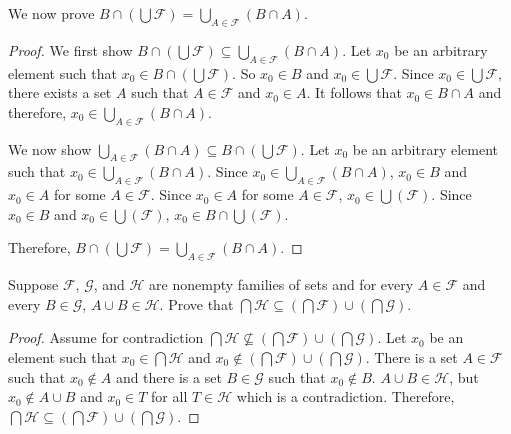 We now prove $B \cap (\bigcup \mathcal{F}) = \bigcup_{A \in \mathcal{F}}(B \cap
    A)$.

\begin{proof}
    We first show $B \cap (\bigcup \mathcal{F}) \subseteq \bigcup_{A \in \mathcal{F}}(B \cap A)$.
    Let $x_0$ be an arbitrary element such that $x_0 \in B \cap (\bigcup \mathcal{F})$.
    So $x_0 \in B$ and $x_0 \in \bigcup \mathcal{F}$.
    Since $x_0 \in \bigcup \mathcal{F}$, there exists a set $A$
    such that $A \in \mathcal{F}$ and $x_0 \in A$.
    It follows that $x_0 \in B \cap A$ and therefore, $x_0 \in \bigcup_{A \in \mathcal{F}}(B \cap A)$.

    We now show $\bigcup_{A \in \mathcal{F}}(B \cap A) \subseteq B \cap (\bigcup
        \mathcal{F})$. Let $x_0$ be an arbitrary element such that $x_0 \in \bigcup_{A
            \in \mathcal{F}}(B \cap A)$. Since $x_0 \in \bigcup_{A \in \mathcal{F}}(B \cap
        A)$, $x_0 \in B$ and $x_0 \in A$ for some $A \in \mathcal{F}$. Since $x_0 \in
        A$ for some $A \in \mathcal{F}$, $x_0 \in \bigcup(\mathcal{F})$. Since $x_0 \in
        B$ and $x_0 \in \bigcup(\mathcal{F})$, $x_0 \in B \cap \bigcup(\mathcal{F})$.

    Therefore, $B \cap (\bigcup \mathcal{F}) = \bigcup_{A \in \mathcal{F}}(B \cap
        A)$.
\end{proof}

\begin{tcolorbox}[title=Problem 18, breakable]
    Suppose $\mathcal{F}$, $\mathcal{G}$, and $\mathcal{H}$
    are nonempty families of sets and for every $A \in \mathcal{F}$
    and every $B \in \mathcal{G}$, $A \cup B \in \mathcal{H}$. 
    Prove that $\bigcap{\mathcal{H}} \subseteq (\bigcap \mathcal{F}) \cup (\bigcap \mathcal{G})$.
\end{tcolorbox}

\begin{proof}
    Assume for contradiction $\bigcap{\mathcal{H}} \not \subseteq (\bigcap \mathcal{F}) \cup (\bigcap \mathcal{G})$.
    Let $x_0$ be an element such that $x_0 \in \bigcap{\mathcal{H}}$
    and $x_0 \not \in (\bigcap \mathcal{F}) \cup (\bigcap \mathcal{G})$.
    There is a set $A \in \mathcal{F}$ such that $x_0 \not \in A$
    and there is a set $B \in \mathcal{G}$ such that $x_0 \not \in B$.
    $A \cup B \in \mathcal{H}$, but $x_0 \not \in A \cup B$ and $x_0 \in T$ for all $T \in \mathcal{H}$
    which is a contradiction.
    Therefore, $\bigcap{\mathcal{H}}
        \subseteq (\bigcap \mathcal{F}) \cup (\bigcap \mathcal{G})$.
\end{proof}

